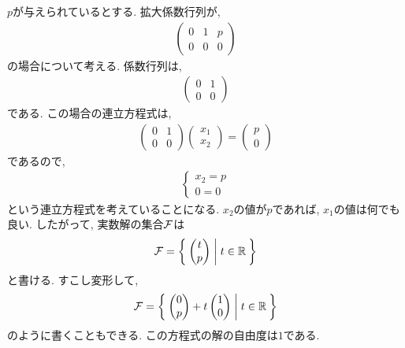 \begin{example}
      \label{eg:eq:reduced:5}
  $p$が与えられているとする.
  拡大係数行列が,
  \begin{align*}
    \begin{pmatrix}
      0&1&p\\0&0&0
    \end{pmatrix}
  \end{align*}
  の場合について考える.
  係数行列は,
  \begin{align*}
    \begin{pmatrix}
      0&1\\0&0
    \end{pmatrix}
  \end{align*}
  である.
  この場合の連立方程式は,
  \begin{align*}
    \begin{pmatrix}
      0&1\\0&0
    \end{pmatrix}
    \begin{pmatrix}x_1\\x_2\end{pmatrix}
      =
      \begin{pmatrix}
        p\\0
      \end{pmatrix}
  \end{align*}
  であるので,
  \begin{align*}
    \begin{cases}
      x_2=p\\
      0=0
    \end{cases}
  \end{align*}
  という連立方程式を考えていることになる.
  $x_2$の値が$p$であれば, $x_1$の値は何でも良い.
  したがって, 実数解の集合$\mathcal{F}$は
  \begin{align*}
    \mathcal{F}=
    \Set{
      \begin{pmatrix}t\\p\end{pmatrix}
        |
        t\in\mathbb{R}}
  \end{align*}
  と書ける.  
  すこし変形して,
  \begin{align*}
    \mathcal{F}=
    \Set{
      \begin{pmatrix}0\\p\end{pmatrix}
        +
        t\begin{pmatrix}1\\0\end{pmatrix}
        |
        t\in\mathbb{R}}
  \end{align*}
  のように書くこともできる.
  この方程式の解の自由度は$1$である.
\end{example}

